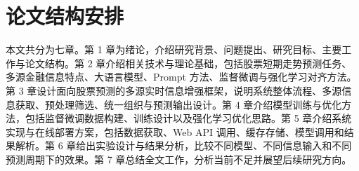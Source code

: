 \section{论文结构安排}

本文共分为七章。第 1 章为绪论，介绍研究背景、问题提出、研究目标、主要工作与论文结构。第 2 章介绍相关技术与理论基础，包括股票短期走势预测任务、多源金融信息特点、大语言模型、Prompt 方法、监督微调与强化学习对齐方法。第 3 章设计面向股票预测的多源实时信息增强框架，说明系统整体流程、多源信息获取、预处理筛选、统一组织与预测输出设计。第 4 章介绍模型训练与优化方法，包括监督微调数据构建、训练设计以及强化学习优化思路。第 5 章介绍系统实现与在线部署方案，包括数据获取、Web API 调用、缓存存储、模型调用和结果解析。第 6 章给出实验设计与结果分析，比较不同模型、不同信息输入和不同预测周期下的效果。第 7 章总结全文工作，分析当前不足并展望后续研究方向。
